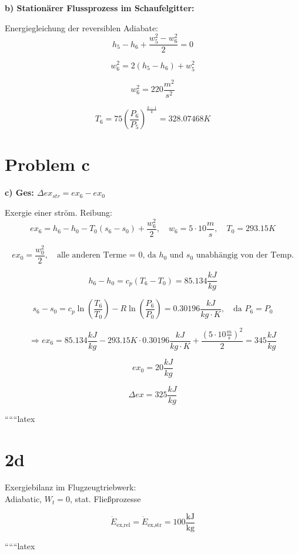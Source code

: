 \textbf{b) Stationärer Flussprozess im Schaufelgitter:}

Energiegleichung der reversiblen Adiabate:
\[
h_5 - h_6 + \frac{w_5^2 - w_6^2}{2} = 0
\]

\[
w_6^2 = 2(h_5 - h_6) + w_5^2
\]

\[
w_6^2 = 220 \frac{m^2}{s^2}
\]

\[
T_6 = 75 \left( \frac{P_6}{P_5} \right)^{\frac{k-1}{k}} = 328.07468 K
\]

\section*{Problem c}

\textbf{c) Ges: $\Delta ex_{str} = ex_6 - ex_0$}

Exergie einer ström. Reibung:
\[
ex_6 = h_6 - h_0 - T_0 (s_6 - s_0) + \frac{w_6^2}{2}, \quad w_6 = 5 \cdot 10 \frac{m}{s}, \quad T_0 = 293.15 K
\]

\[
ex_0 = \frac{w_0^2}{2}, \quad \text{alle anderen Terme = 0, da } h_0 \text{ und } s_0 \text{ unabhängig von der Temp.}
\]

\[
h_6 - h_0 = c_p (T_6 - T_0) = 85.134 \frac{kJ}{kg}
\]

\[
s_6 - s_0 = c_p \ln \left( \frac{T_6}{T_0} \right) - R \ln \left( \frac{P_6}{P_0} \right) = 0.30196 \frac{kJ}{kg \cdot K}, \quad \text{da } P_6 = P_0
\]

\[
\Rightarrow ex_6 = 85.134 \frac{kJ}{kg} - 293.15 K \cdot 0.30196 \frac{kJ}{kg \cdot K} + \frac{(5 \cdot 10 \frac{m}{s})^2}{2} = 345 \frac{kJ}{kg}
\]

\[
ex_0 = 20 \frac{kJ}{kg}
\]

\[
\Delta ex = 325 \frac{kJ}{kg}
\]

``````latex


\section*{2d}

Exergiebilanz im Flugzeugtriebwerk: \\
Adiabatic, \( W_t = 0 \), stat. Fließprozesse

\[
\dot{E}_{\text{ex,rel}} = \dot{E}_{\text{ex,str}} = 100 \frac{\text{kJ}}{\text{kg}}
\]

``````latex


